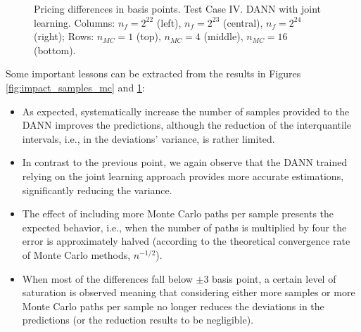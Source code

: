 		\begin{figure}[h!]
			\centering
			\caption{Pricing differences in basis points. Test Case IV. DANN with joint learning. Columns: $n_f = 2^{22}$ (left), $n_f = 2^{23}$ (central), $n_f = 2^{24}$ (right); Rows: $n_{MC} = 1$ (top), $n_{MC} = 4$ (middle), $n_{MC} = 16$ (bottom).}
			\label{fig:impact_samples_mc_joint}
		\end{figure}

		Some important lessons can be extracted from the results in Figures \ref{fig:impact_samples_mc} and \ref{fig:impact_samples_mc_joint}:
		\begin{itemize}
			\item As expected, systematically increase the number of samples provided to the DANN improves the predictions, although the reduction of the interquantile intervals, i.e., in the deviations' variance, is rather limited.
			
			\item In contrast to the previous point, we again observe that the DANN trained relying on the joint learning approach provides more accurate estimations, significantly reducing the variance.
			
			\item The effect of including more Monte Carlo paths per sample presents the expected behavior, i.e., when the number of paths is multiplied by four the error is approximately halved (according to the theoretical convergence rate of Monte Carlo methods, $n^{-1/2}$).

			\item When most of the differences fall below $\pm 3$ basis point, a certain level of saturation is observed meaning that considering either more samples or more Monte Carlo paths per sample no longer reduces the deviations in the predictions (or the reduction results to be negligible).
		\end{itemize}


